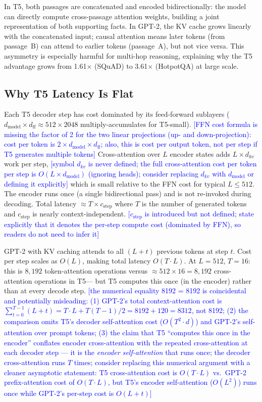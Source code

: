 \documentclass[11pt]{article}
\newcommand{\techcheck}[1]{\textcolor{blue}{[#1]}}
\begin{document}
In T5, both passages are concatenated and encoded bidirectionally:
the model can directly compute cross-passage attention weights, building a
joint representation of both supporting facts.
In GPT-2, the KV cache grows linearly with the concatenated input;
causal attention means later tokens (from passage~B) can attend to
earlier tokens (passage~A), but not vice versa.
This asymmetry is especially harmful for multi-hop reasoning,
explaining why the T5 advantage grows from 1.61$\times$ (SQuAD) to
3.61$\times$ (HotpotQA) at large scale.

\subsection{Why T5 Latency Is Flat}

Each T5 decoder step has cost dominated by its feed-forward sublayers
($d_\text{model} \times d_\text{ff} \approx 512 \times 2048$ multiply-accumulates
for T5-small).
\techcheck{FFN cost formula is missing the factor of 2 for the two linear projections (up- and down-projection): cost per token is $2 \times d_\text{model} \times d_\text{ff}$; also, this is cost per output token, not per step if T5 generates multiple tokens}
Cross-attention over $L$ encoder states adds $L \times d_{kv}$ work per step,
\techcheck{symbol $d_{kv}$ is never defined; the full cross-attention cost per token per step is $O(L \times d_\text{model})$ (ignoring heads); consider replacing $d_{kv}$ with $d_\text{model}$ or defining it explicitly}
which is small relative to the FFN cost for typical $L \leq 512$.
The encoder runs once (a single bidirectional pass) and is not re-invoked
during decoding.
Total latency $\approx T \times c_\text{step}$ where $T$ is the number of
generated tokens and $c_\text{step}$ is nearly context-independent.
\techcheck{$c_\text{step}$ is introduced but not defined; state explicitly that it denotes the per-step compute cost (dominated by FFN), so readers do not need to infer it}

GPT-2 with KV caching attends to all $(L + t)$ previous tokens at step $t$.
Cost per step scales as $O(L)$, making total latency $O(T \cdot L)$.
At $L = 512$, $T = 16$: this is $8{,}192$ token-attention operations
versus $\approx 512 \times 16 = 8{,}192$ cross-attention operations in T5---
but T5 computes this once (in the encoder) rather than at every decode step.
\techcheck{the numerical equality 8192 = 8192 is coincidental and potentially misleading: (1) GPT-2's total context-attention cost is $\sum_{t=0}^{T-1}(L+t) = T \cdot L + T(T-1)/2 = 8192 + 120 = 8312$, not 8192; (2) the comparison omits T5's decoder self-attention cost ($O(T^2 \cdot d)$) and GPT-2's self-attention over prompt tokens; (3) the claim that T5 ``computes this once in the encoder'' conflates encoder cross-attention with the repeated cross-attention at each decoder step --- it is the \emph{encoder self-attention} that runs once; the decoder cross-attention runs $T$ times; consider replacing this numerical argument with a cleaner asymptotic statement: T5 cross-attention cost is $O(T \cdot L)$ vs.\ GPT-2 prefix-attention cost of $O(T \cdot L)$, but T5's encoder self-attention ($O(L^2)$) runs once while GPT-2's per-step cost is $O(L+t)$}
\end{document}
